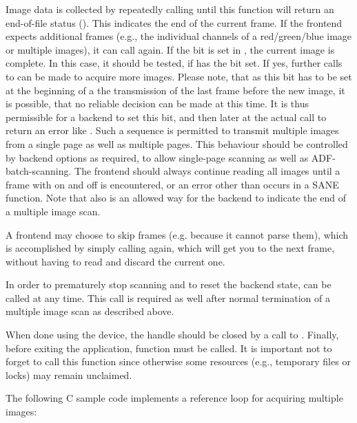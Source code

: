 \documentclass[11pt,DVIps]{report}
\begin{document}
\begin{changebar}
Image data is collected by repeatedly calling 
until this function will return an end-of-file status
().  This indicates the end of the current
frame. If the frontend expects additional frames (e.g., the
individual channels of a red/green/blue image or multiple images),
it can call  again.
If the  bit is set in , the
current image is complete. In this case, it should be tested, if
 has the  bit set.
If yes, further calls to  can be made to acquire
more images. Please note, that as this bit has to be set at the beginning
of a the transmission of the last frame before the new image, it is possible,
that no reliable decision can be made at this time. It is thus permissible
for a backend to set this bit, and then later at the actual call to
 return an error like . 
Such a sequence is permitted to transmit multiple images from a single 
page as well as multiple pages. This behaviour should be controlled by 
backend options as required, to allow single-page scanning as well as 
ADF-batch-scanning. The frontend should always continue reading all images 
until a frame with  on
and  off is encountered, or an error other
than  occurs in a SANE function.
Note that  also is an allowed way for the backend
to indicate the end of a multiple image scan.

A frontend may choose to skip frames (e.g. because it cannot parse them), 
which is accomplished by simply calling  again, which will get 
you to the next frame, without having to read and discard the current one.

In order to prematurely stop scanning and to reset the backend state, 
 can be called at any time. This call is required 
as well after normal termination of a multiple image scan as described above.

When done using the device, the handle should be closed by a call to
.  Finally, before exiting the application,
function  must be called.  It is important not to
forget to call this function since otherwise some resources (e.g.,
temporary files or locks) may remain unclaimed.

The following C sample code implements a reference loop for acquiring 
multiple images:


\end{changebar}
\end{document}
